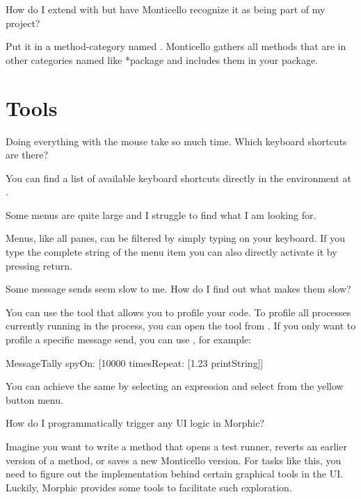 \documentclass[a4paper,10pt,twoside]{book}
\begin{document}
{\begin{faq}
How do I extend  with  but have Monticello recognize it as being part of my  project?
\end{faq}
\answer
Put it in a method-category named .
Monticello gathers all methods that are in other categories named like *package and includes them in your package.

\section{Tools}

\begin{faq}
Doing everything with the mouse take so much time.
Which keyboard shortcuts are there?
\end{faq}
\answer
You can find a list of available keyboard shortcuts directly in the environment at .

\begin{faq}
Some menus are quite large and I struggle to find what I am looking for.
\end{faq}
\answer
Menus, like all panes, can be filtered by simply typing on your keyboard.
If you type the complete string of the menu item you can also directly activate it by pressing return.

\begin{faq}
Some message sends seem slow to me.
How do I find out what makes them slow?
\end{faq}
\answer
You can use the  tool that allows you to profile your code.
To profile all processes currently running in the process, you can open the tool from .
If you only want to profile a specific message send, you can use , for example:
\begin{code}{}
MessageTally spyOn: [10000 timesRepeat: [1.23 printString]]
\end{code}
You can achieve the same by selecting an expression and select  from the yellow button menu.

\begin{faq}
How do I programmatically trigger any UI logic in Morphic?
\end{faq}
\answer
Imagine you want to write a method that opens a test runner, reverts an earlier version of a method, or saves a new Monticello version.
For tasks like this, you need to figure out the implementation behind certain graphical tools in the UI.
Luckily, Morphic provides some tools to facilitate such exploration.

}
\end{document}
